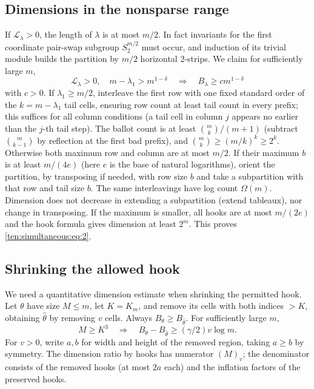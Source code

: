 \subsection{Dimensions in the nonsparse range}
If \(\mathcal L_\lambda>0\), the length of \(\lambda\) is at most \(m/2\). In fact invariants for the first coordinate pair-swap subgroup \(S_2^{m/2}\) must occur, and induction of its trivial module builds the partition by \(m/2\) horizontal 2-strips. We claim for sufficiently large \(m\),
\begin{equation}
 \mathcal L_\lambda>0,\quad m-\lambda_1>m^{1-\delta}
 \quad\Longrightarrow\quad B_\lambda\ge c m^{1-\delta}                \label{ten:simultaneous:eq:2}
\end{equation}
with \(c>0\). If \(\lambda_1\ge m/2\), interleave the first row with one fixed standard order of the \(k=m-\lambda_1\) tail cells, ensuring row count at least tail count in every prefix; this suffices for all column conditions (a tail cell in column \(j\) appears no earlier than the \(j\)-th tail step). The ballot count is at least \(\binom mk/(m+1)\) (subtract \(\binom m{k-1}\) by reflection at the first bad prefix), and \(\binom mk\ge(m/k)^k\ge2^k\). Otherwise both maximum row and column are at most \(m/2\). If their maximum \(b\) is at least \(m/(4e)\) (here \(e\) is the base of natural logarithms), orient the partition, by transposing if needed, with row size \(b\) and take a subpartition with that row and tail size \(b\). The same interleavings have log count \(\Omega(m)\). Dimension does not decrease in extending a subpartition (extend tableaux), nor change in transposing. If the maximum is smaller, all hooks are at most \(m/(2e)\) and the hook formula gives dimension at least \(2^m\). This proves \eqref{ten:simultaneous:eq:2}.

\subsection{Shrinking the allowed hook}
We need a quantitative dimension estimate when shrinking the permitted hook. Let \(\theta\) have size \(M\le m\), let \(K=K_m\), and remove its cells with both indices \(>K\), obtaining \(\widehat\theta\) by removing \(v\) cells. Always \(B_\theta\ge B_{\widehat\theta}\). For sufficiently large \(m\),
\begin{equation}
 M\ge K^3\quad\Longrightarrow\quad
 B_\theta-B_{\widehat\theta}\ge (\gamma/2)v\log m.                     \label{ten:simultaneous:eq:7}
\end{equation}
For \(v>0\), write \(a,b\) for width and height of the removed region, taking \(a\ge b\) by symmetry. The dimension ratio by hooks has numerator \((M)_v\); the denominator consists of the removed hooks (at most \(2a\) each) and the inflation factors of the preserved hooks.

